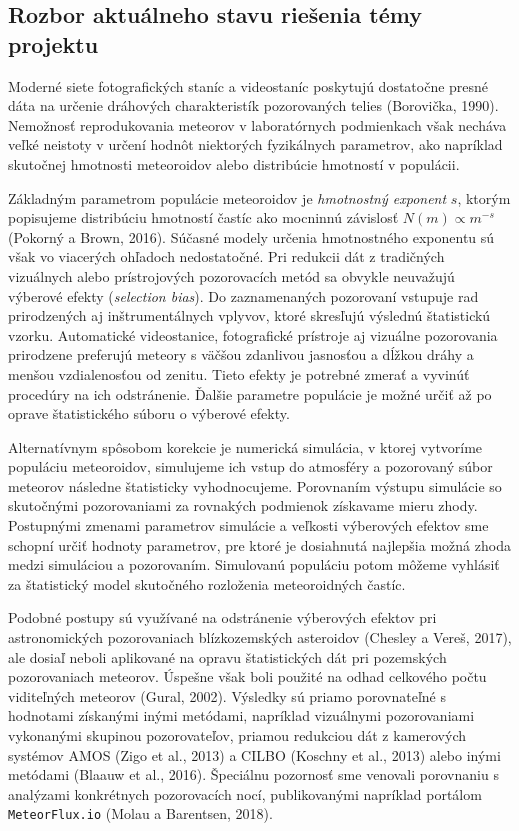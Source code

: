\subsection{Rozbor aktuálneho stavu riešenia témy
projektu}\label{rozbor-aktuuxe1lneho-stavu-rieux161enia-tuxe9my-projektu}

Moderné siete fotografických staníc a videostaníc poskytujú dostatočne
presné dáta na určenie dráhových charakteristík pozorovaných telies
(Borovička, 1990). Nemožnosť reprodukovania meteorov v laboratórnych
podmienkach však necháva veľké neistoty v určení hodnôt niektorých
fyzikálnych parametrov, ako napríklad skutočnej hmotnosti meteoroidov
alebo distribúcie hmotností v populácii.

Základným parametrom populácie meteoroidov je \emph{hmotnostný exponent}
\(s\), ktorým popisujeme distribúciu hmotností častíc ako mocninnú
závislosť \(N(m) \propto m^{-s}\) (Pokorný a Brown, 2016). Súčasné
modely určenia hmotnostného exponentu sú však vo viacerých ohľadoch
nedostatočné. Pri redukcii dát z tradičných vizuálnych alebo
prístrojových pozorovacích metód sa obvykle neuvažujú výberové efekty
(\emph{selection bias}). Do zaznamenaných pozorovaní vstupuje rad
prirodzených aj inštrumentálnych vplyvov, ktoré skresľujú výslednú
štatistickú vzorku. Automatické videostanice, fotografické prístroje aj
vizuálne pozorovania prirodzene preferujú meteory s väčšou zdanlivou
jasnosťou a dĺžkou dráhy a menšou vzdialenosťou od zenitu. Tieto efekty
je potrebné zmerať a vyvinúť procedúry na ich odstránenie. Ďalšie
parametre populácie je možné určiť až po oprave štatistického súboru o
výberové efekty.

Alternatívnym spôsobom korekcie je numerická simulácia, v ktorej
vytvoríme populáciu meteoroidov, simulujeme ich vstup do atmosféry a
pozorovaný súbor meteorov následne štatisticky vyhodnocujeme. Porovnaním
výstupu simulácie so skutočnými pozorovaniami za rovnakých podmienok
získavame mieru zhody. Postupnými zmenami parametrov simulácie a
veľkosti výberových efektov sme schopní určiť hodnoty parametrov, pre
ktoré je dosiahnutá najlepšia možná zhoda medzi simuláciou a
pozorovaním. Simulovanú populáciu potom môžeme vyhlásiť za štatistický
model skutočného rozloženia meteoroidných častíc.

Podobné postupy sú využívané na odstránenie výberových efektov pri
astronomických pozorovaniach blízkozemských asteroidov (Chesley a Vereš,
2017), ale dosiaľ neboli aplikované na opravu štatistických dát pri
pozemských pozorovaniach meteorov. Úspešne však boli použité na odhad
celkového počtu viditeľných meteorov (Gural, 2002). Výsledky sú priamo
porovnateľné s hodnotami získanými inými metódami, napríklad vizuálnymi
pozorovaniami vykonanými skupinou pozorovateľov, priamou redukciou dát z
kamerových systémov AMOS (Zigo et al., 2013) a CILBO (Koschny et al.,
2013) alebo inými metódami (Blaauw et al., 2016). Špeciálnu pozornosť
sme venovali porovnaniu s analýzami konkrétnych pozorovacích nocí,
publikovanými napríklad portálom \texttt{MeteorFlux.io} (Molau a
Barentsen, 2018).

